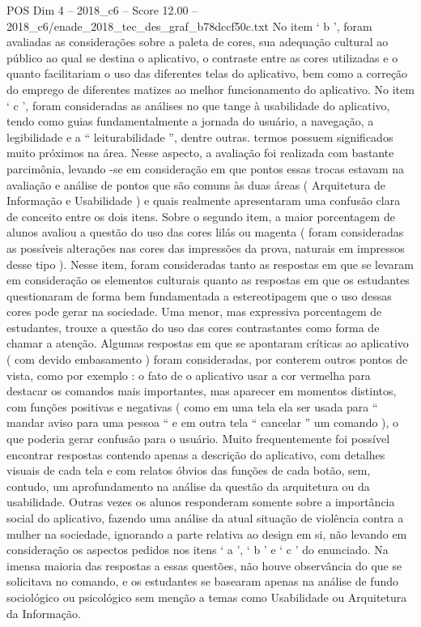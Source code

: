 \begin{textsample}{POS Dim 4 – 2018\_c6 – Score 12.00 – 2018\_c6/enade\_2018\_tec\_des\_graf\_b78dccf50c.txt}
No item ‘ b ’, foram avaliadas as considerações sobre a paleta de cores, sua adequação cultural ao público ao qual se destina o aplicativo, o contraste entre as cores utilizadas e o quanto facilitariam o uso das diferentes telas do aplicativo, bem como a correção do emprego de diferentes matizes ao melhor funcionamento do aplicativo.
No item ‘ c ’, foram consideradas as análises no que tange à usabilidade do aplicativo, tendo como guias fundamentalmente a jornada do usuário, a navegação, a legibilidade e a “ leiturabilidade ”, dentre outras. termos possuem significados muito próximos na área.
Nesse aspecto, a avaliação foi realizada com bastante parcimônia, levando -se em consideração em que pontos essas trocas estavam na avaliação e análise de pontos que são comuns às duas áreas ( Arquitetura de Informação e Usabilidade ) e quais realmente apresentaram uma confusão clara de conceito entre os dois itens.
Sobre o segundo item, a maior porcentagem de alunos avaliou a questão do uso das cores lilás ou magenta ( foram consideradas as possíveis alterações nas cores das impressões da prova, naturais em impressos desse tipo ).
Nesse item, foram consideradas tanto as respostas em que se levaram em consideração os elementos culturais quanto as respostas em que os estudantes questionaram de forma bem fundamentada a estereotipagem que o uso dessas cores pode gerar na sociedade.
Uma menor, mas expressiva porcentagem de estudantes, trouxe a questão do uso das cores contrastantes como forma de chamar a atenção.
Algumas respostas em que se apontaram críticas ao aplicativo ( com devido embasamento ) foram consideradas, por conterem outros pontos de vista, como por exemplo : o fato de o aplicativo usar a cor vermelha para destacar os comandos mais importantes, mas aparecer em momentos distintos, com funções positivas e negativas ( como em uma tela ela ser usada para “ mandar aviso para uma pessoa “ e em outra tela “ cancelar ” um comando ), o que poderia gerar confusão para o usuário.
Muito frequentemente foi possível encontrar respostas contendo apenas a descrição do aplicativo, com detalhes visuais de cada tela e com relatos óbvios das funções de cada botão, sem, contudo, um aprofundamento na análise da questão da arquitetura ou da usabilidade.
Outras vezes os alunos responderam somente sobre a importância social do aplicativo, fazendo uma análise da atual situação de violência contra a mulher na sociedade, ignorando a parte relativa ao design em si, não levando em consideração os aspectos pedidos nos itens ‘ a ’, ‘ b ’ e ‘ c ’ do enunciado.
Na imensa maioria das respostas a essas questões, não houve observância do que se solicitava no comando, e os estudantes se basearam apenas na análise de fundo sociológico ou psicológico sem menção a temas como Usabilidade ou Arquitetura da Informação.

\end{textsample}

